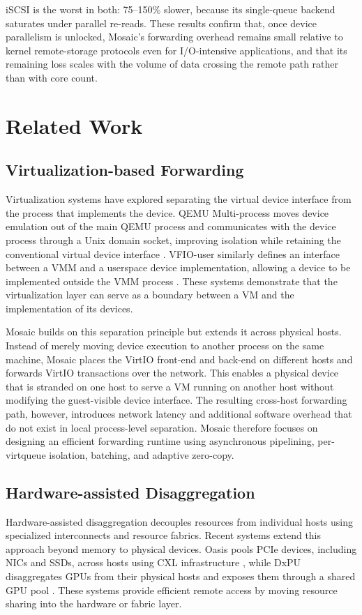 \documentclass[sigplan,10pt]{acmart}
\begin{document}
iSCSI is the worst in both: 75--150\% slower, because its single-queue backend saturates under parallel re-reads. These results confirm that, once device parallelism is unlocked, Mosaic's forwarding overhead remains small relative to kernel remote-storage protocols even for I/O-intensive applications, and that its remaining loss scales with the volume of data crossing the remote path rather than with core count.

\section{Related Work}\label{relatedwork}
\subsection{Virtualization-based Forwarding}
Virtualization systems have explored separating the virtual device interface from the process that implements the device. QEMU Multi-process moves device emulation out of the main QEMU process and communicates with the device process through a Unix domain socket, improving isolation while retaining the conventional virtual device interface \cite{qemu-multiprocess}. VFIO-user similarly defines an interface between a VMM and a userspace device implementation, allowing a device to be implemented outside the VMM process \cite{vfio-user}. These systems demonstrate that the virtualization layer can serve as a boundary between a VM and the implementation of its devices.

Mosaic builds on this separation principle but extends it across physical hosts. Instead of merely moving device execution to another process on the same machine, Mosaic places the VirtIO front-end and back-end on different hosts and forwards VirtIO transactions over the network. This enables a physical device that is stranded on one host to serve a VM running on another host without modifying the guest-visible device interface. The resulting cross-host forwarding path, however, introduces network latency and additional software overhead that do not exist in local process-level separation. Mosaic therefore focuses on designing an efficient forwarding runtime using asynchronous pipelining, per-virtqueue isolation, batching, and adaptive zero-copy.

\subsection{Hardware-assisted Disaggregation}
Hardware-assisted disaggregation decouples resources from individual hosts using specialized interconnects and resource fabrics. Recent systems extend this approach beyond memory to physical devices. Oasis pools PCIe devices, including NICs and SSDs, across hosts using CXL infrastructure \cite{oasis}, while DxPU disaggregates GPUs from their physical hosts and exposes them through a shared GPU pool \cite{dxpu}. These systems provide efficient remote access by moving resource sharing into the hardware or fabric layer.
\end{document}
